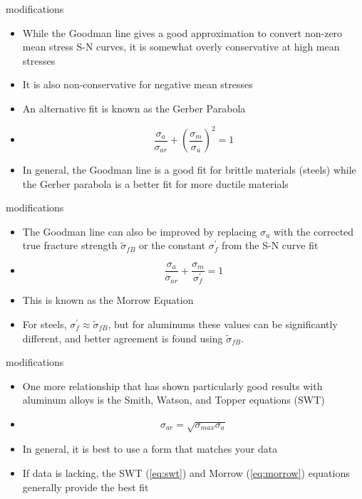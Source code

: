 \documentclass[10pt]{beamer}
\begin{document}
\begin{frame}{modifications}
	\begin{itemize}[<+->]
		\item While the Goodman line gives a good approximation to convert non-zero mean stress S-N curves, it is somewhat overly conservative at high mean stresses
		\item It is also non-conservative for negative mean stresses
		\item An alternative fit is known as the Gerber Parabola
		\item[]\begin{equation}
		\frac{\sigma_a}{\sigma_{ar}} + \left(\frac{\sigma_m}{\sigma_u}\right)^2 = 1
		\end{equation}
		\item In general, the Goodman line is a good fit for brittle materials (steels) while the Gerber parabola is a better fit for more ductile materials
	\end{itemize}
\end{frame}

\begin{frame}{modifications}
	\begin{itemize}[<+->]
		\item The Goodman line can also be improved by replacing $\sigma_u$ with the corrected true fracture strength $\tilde{\sigma}_{fB}$ or the constant $\sigma_f^\prime$ from the S-N curve fit
		\item[] \begin{equation}
		\label{eq:morrow}
		\frac{\sigma_a}{\sigma_{ar}} + \frac{\sigma_m}{\sigma_f^\prime} = 1
		\end{equation}
		\item This is known as the Morrow Equation
		\item For steels, $\sigma_f^\prime \approx \tilde{\sigma}_{fB}$, but for aluminums these values can be significantly different, and better agreement is found using $\tilde{\sigma}_{fB}$.
	\end{itemize}
\end{frame}

\begin{frame}{modifications}
	\begin{itemize}[<+->]
		\item One more relationship that has shown particularly good results with aluminum alloys is the Smith, Watson, and Topper equations (SWT)
		\item[] \begin{equation}
		\label{eq:swt}
		\sigma_{ar} = \sqrt{\sigma_{max}\sigma_a}
		\end{equation}
		\item In general, it is best to use a form that matches your data
		\item If data is lacking, the SWT (\ref{eq:swt}) and Morrow (\ref{eq:morrow}) equations generally provide the best fit
	\end{itemize}
\end{frame}
\end{document}
